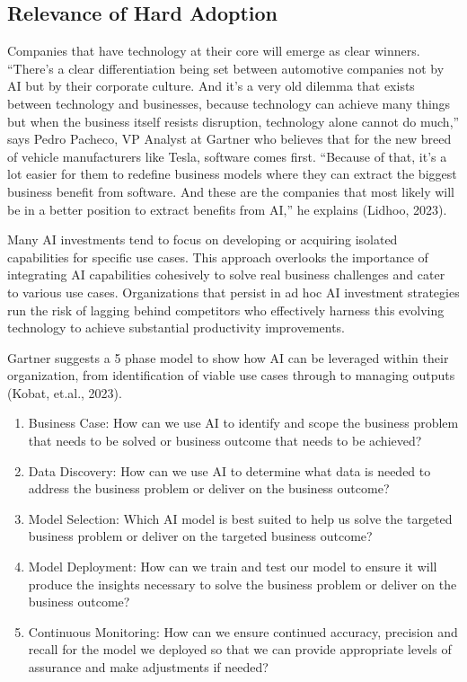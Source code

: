 \documentclass[
]{article}
\begin{document}
\hypertarget{relevance-of-hard-adoption}{%
\subsection*{Relevance of Hard Adoption}\label{relevance-of-hard-adoption}}

Companies that have technology at their core will emerge as clear winners. ``There's a clear differentiation being set between automotive companies not by AI but by their corporate culture. And it's a very old dilemma that exists between technology and businesses, because technology can achieve many things but when the business itself resists disruption, technology alone cannot do much,'' says Pedro Pacheco, VP Analyst at Gartner who believes that for the new breed of vehicle manufacturers like Tesla, software comes first. ``Because of that, it's a lot easier for them to redefine business models where they can extract the biggest business benefit from software. And these are the companies that most likely will be in a better position to extract benefits from AI,'' he explains (Lidhoo, 2023).

Many AI investments tend to focus on developing or acquiring isolated capabilities for specific use cases. This approach overlooks the importance of integrating AI capabilities cohesively to solve real business challenges and cater to various use cases. Organizations that persist in ad hoc AI investment strategies run the risk of lagging behind competitors who effectively harness this evolving technology to achieve substantial productivity improvements.

Gartner suggests a 5 phase model to show how AI can be leveraged within their organization, from identification of viable use cases through to managing outputs (Kobat, et.al., 2023).

\begin{enumerate}
\def\labelenumi{\arabic{enumi}.}
\item
  Business Case: How can we use AI to identify and scope the business problem that needs to be solved or business outcome that needs to be achieved?
\item
  Data Discovery: How can we use AI to determine what data is needed to address the business problem or deliver on the business outcome?
\item
  Model Selection: Which AI model is best suited to help us solve the targeted business problem or deliver on the targeted business outcome?
\item
  Model Deployment: How can we train and test our model to ensure it will produce the insights necessary to solve the business problem or deliver on the business outcome?
\item
  Continuous Monitoring: How can we ensure continued accuracy, precision and recall for the model we deployed so that we can provide appropriate levels of assurance and make adjustments if needed?
\end{enumerate}
\end{document}
